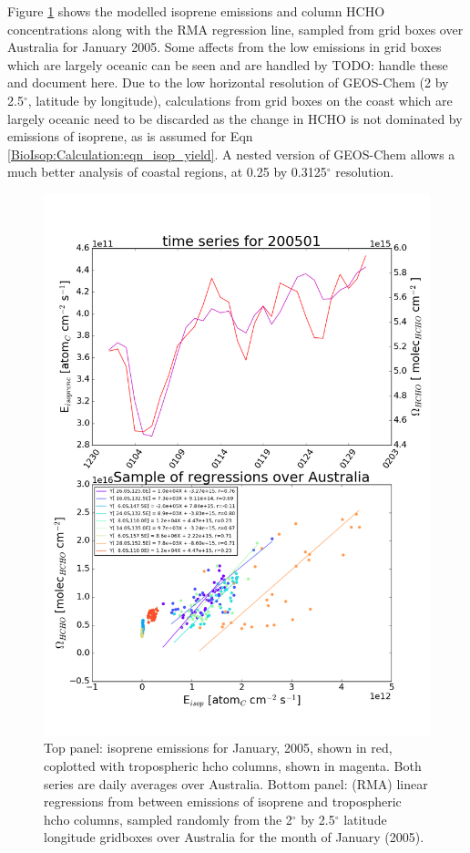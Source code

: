     Figure \ref{BioIsop:Calculation:fig_E_isop_vs_hcho_model_sample} shows the modelled isoprene emissions and column HCHO concentrations along with the RMA regression line, sampled from grid boxes over Australia for January 2005.
    Some affects from the low emissions in grid boxes which are largely oceanic can be seen and are handled by TODO: handle these and document here.
    Due to the low horizontal resolution of GEOS-Chem (2 by 2.5$^{\circ}$, latitude by longitude), calculations from grid boxes on the coast which are largely oceanic need to be discarded as the change in HCHO is not dominated by emissions of isoprene, as is assumed for Eqn \ref{BioIsop:Calculation:eqn_isop_yield}.
    A nested version of GEOS-Chem allows a much better analysis of coastal regions, at 0.25 by 0.3125$^{\circ}$ resolution.
    \begin{figure}
      \includegraphics[width=\textwidth]{Figures/Isoprene/E_isop_vs_hcho_series_200501.png}
      \caption{%
        Top panel: isoprene emissions for January, 2005, shown in red, coplotted with tropospheric hcho columns, shown in magenta.
        Both series are daily averages over Australia.
        Bottom panel: (RMA) linear regressions from between emissions of isoprene and tropospheric hcho columns, sampled randomly from the 2$^{\circ}$ by 2.5$^{\circ}$ latitude longitude gridboxes over Australia for the month of January (2005).
      }
      \label{BioIsop:Calculation:fig_E_isop_vs_hcho_model_sample}
    \end{figure}
    
